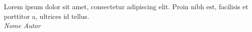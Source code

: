 
\begin{epigrafe}

\noindent
Lorem ipsum dolor sit amet, consectetur adipiscing elit. Proin nibh est, facilisis et porttitor a, ultrices id tellus.\\
\hspace*{\fill} \textit{Nome Autor}

\end{epigrafe}
